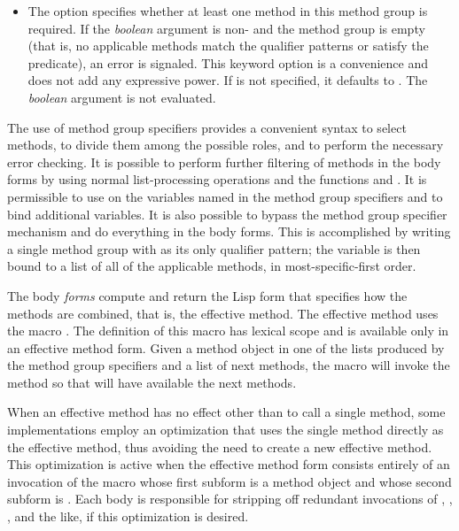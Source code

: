 \begin{defmac}
\begin{itemize}
\item 
The  option specifies whether at least one method in
this method group is required.  If the \emph{boolean\/} argument is
non- and the method group is empty (that is, no applicable
methods match the qualifier patterns or satisfy the predicate), an
error is signaled.  This keyword option is a convenience and does not
add any expressive power.  If  is not specified,
it defaults to .  The \emph{boolean\/} argument is not
evaluated.

\end{itemize}

The use of method group specifiers provides a convenient syntax to
select methods, to divide them among the possible roles, and to perform the
necessary error checking.  It is possible to perform further filtering
of methods in the body forms by using normal list-processing operations
and the functions  and 
.  It is permissible to use  on the
variables named in the method group specifiers and to bind additional
variables.  It is also possible to bypass the method group specifier
mechanism and do everything in the body forms.  This is accomplished
by writing a single method group with \cdf{*} as its only qualifier
pattern; the variable is then bound to a list of all of the applicable
methods, in most-specific-first order.

The body \emph{forms\/} compute and return the Lisp form that specifies
how the methods are combined, that is, the effective method.  The
effective method uses the macro .  The definition of this macro has
lexical scope and is available only in an effective method form.
Given a method object in one of the lists produced by the method group
specifiers and a list of next methods, the macro 
will invoke the method so that  will have available
the next methods.

When an effective method has no effect other than to call a single
method, some implementations employ an optimization that uses the
single method directly as the effective method, thus avoiding the need
to create a new effective method.  This optimization is active when
the effective method form consists entirely of an invocation of
the  macro whose first subform is a method object and
whose second subform is .  Each 
 body is responsible for stripping off
redundant invocations of , , 
, and the like, if this optimization is desired.



\end{defmac}
